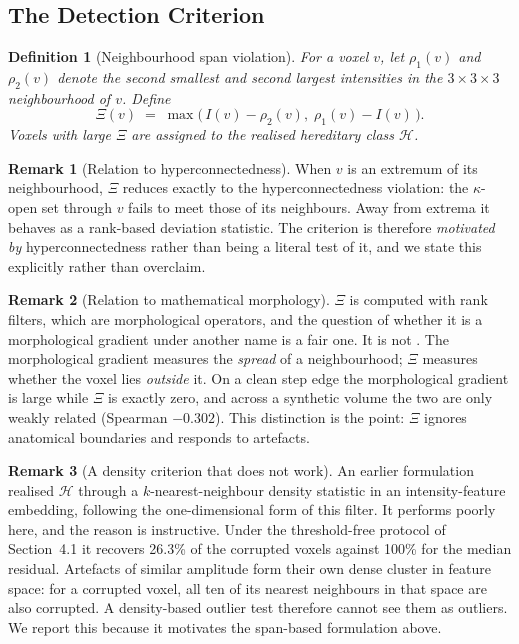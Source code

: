 \documentclass[12pt]{article}
\newtheorem{definition}{Definition}[section]
\theoremstyle{definition}
\newtheorem{remark}{Remark}[section]
\theoremstyle{plain}
\begin{document}
\subsection{The Detection Criterion}

\begin{definition}[Neighbourhood span violation]
For a voxel $v$, let $\rho_1(v)$ and $\rho_2(v)$ denote the second smallest and
second largest intensities in the $3\times3\times3$ neighbourhood of $v$. Define
\begin{equation}
    \Xi(v) \;=\; \max\bigl(\, I(v) - \rho_2(v),\; \rho_1(v) - I(v) \,\bigr).
\end{equation}
Voxels with large $\Xi$ are assigned to the realised hereditary class $\mathcal{H}$.
\end{definition}

\begin{remark}[Relation to hyperconnectedness]
When $v$ is an extremum of its neighbourhood, $\Xi$ reduces exactly to the
hyperconnectedness violation: the $\kappa$-open set through $v$ fails to meet those
of its neighbours. Away from extrema it behaves as a rank-based deviation statistic.
The criterion is therefore \emph{motivated by} hyperconnectedness rather than being a
literal test of it, and we state this explicitly rather than overclaim.
\end{remark}

\begin{remark}[Relation to mathematical morphology]
$\Xi$ is computed with rank filters, which are morphological operators, and the
question of whether it is a morphological gradient under another name is a fair one.
It is not \cite{serra1982}. The morphological gradient measures the \emph{spread} of a neighbourhood;
$\Xi$ measures whether the voxel lies \emph{outside} it. On a clean step edge the
morphological gradient is large while $\Xi$ is exactly zero, and across a synthetic
volume the two are only weakly related (Spearman $-0.302$). This distinction is the
point: $\Xi$ ignores anatomical boundaries and responds to artefacts.
\end{remark}

\begin{remark}[A density criterion that does not work]
An earlier formulation realised $\mathcal{H}$ through a $k$-nearest-neighbour density
statistic in an intensity-feature embedding, following the one-dimensional form of
this filter. It performs poorly here, and the reason is instructive. Under the
threshold-free protocol of Section~4.1 it recovers 26.3\% of the corrupted voxels
against 100\% for the median residual. Artefacts of similar amplitude form their own
dense cluster in feature space: for a corrupted voxel, all ten of its nearest
neighbours in that space are also corrupted. A density-based outlier test therefore
cannot see them as outliers. We report this because it motivates the span-based
formulation above.
\end{remark}
\end{document}
